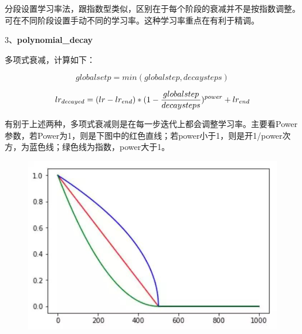 \begin{Shaded}
\begin{Highlighting}[]
\OperatorTok{=}\NormalTok{)}
\end{Highlighting}
\end{Shaded}

分段设置学习率法，跟指数型类似，区别在于每个阶段的衰减并不是按指数调整。可在不同阶段设置手动不同的学习率。这种学习率重点在有利于精调。

3、\textbf{polynomial\_decay}

\begin{Shaded}
\begin{Highlighting}[]
\OperatorTok{=}\OperatorTok{=}\NormalTok{,}
\OperatorTok{=}\OperatorTok{=}\NormalTok{)}
\end{Highlighting}
\end{Shaded}

多项式衰减，计算如下：

\[
global setp = min(global step, decay steps)
\]

\[
lr_{decayed} = (lr-lr_{end})*(1-{globalstep\over decaysteps})^{power} +lr_{end}
\]

有别于上述两种，多项式衰减则是在每一步迭代上都会调整学习率。主要看Power参数，若Power为1，则是下图中的红色直线；若power小于1，则是开1/power次方，为蓝色线；绿色线为指数，power大于1。

\begin{figure}
\centering
\includegraphics{./img/ch14/多项式衰减.jpeg}
\caption{}
\end{figure}

